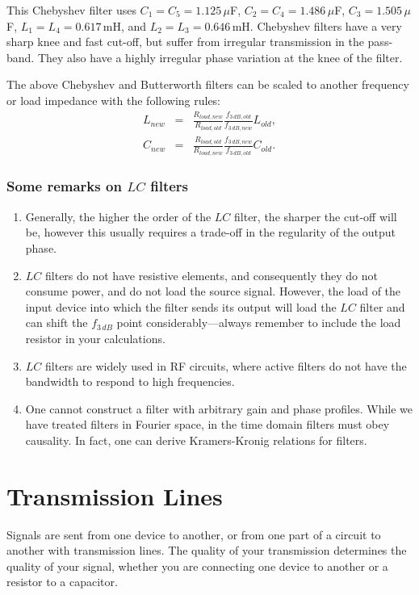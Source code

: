 \documentclass{article}
\begin{document}
This Chebyshev filter uses $C_1 = C_5 = 1.125\,\mu$F, $C_2 = C_4 = 1.486\,\mu$F, $C_3 = 1.505\,\mu$F, $L_1 = L_4 = 0.617$\,mH, and $L_2 = L_3 = 0.646$\,mH. Chebyshev filters have a very sharp knee and fast cut-off, but suffer from irregular transmission in the pass-band. They also have a highly irregular phase variation at the knee of the filter.

The above Chebyshev and Butterworth filters can be scaled to another frequency or load impedance with the following rules:
\begin{eqnarray}
L_{new} & = & \frac{R_{load,new}}{R_{load,old}} \frac{f_{3\,dB,old}}{f_{3\,dB,new}} L_{old}, \\
C_{new} & = & \frac{R_{load,old}}{R_{load,new}} \frac{f_{3\,dB,new}}{f_{3\,dB,old}} C_{old}.
\end{eqnarray}


\subsubsection{Some remarks on $LC$ filters}
\begin{enumerate}
\item Generally, the higher the order of the $LC$ filter, the sharper the cut-off will be, however this usually requires a trade-off in the regularity of the output phase.
\item $LC$ filters do not have resistive elements, and consequently they do not consume power, and do not load the source signal. However, the load of the input device into which the filter sends its output will load the $LC$ filter and can shift the $f_{3\,dB}$ point considerably---always remember to include the load resistor in your calculations.
\item $LC$ filters are widely used in RF circuits, where active filters do not have the bandwidth to respond to high frequencies.
\item One cannot construct a filter with arbitrary gain and phase profiles. While we have treated filters in Fourier space, in the time domain filters must obey causality. In fact, one can derive Kramers-Kronig relations for filters.
\end{enumerate}

\section{Transmission Lines}
Signals are sent from one device to another, or from one part of a circuit to another with transmission lines. The quality of your transmission determines the quality of your signal, whether you are connecting one device to another or a resistor to a capacitor.
\end{document}
